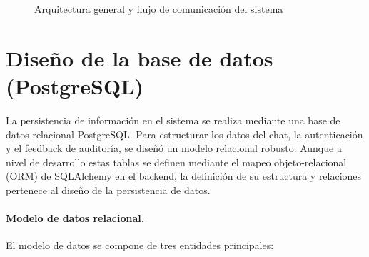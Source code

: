\documentclass[12pt,a4paper,oneside]{report}
\begin{document}
\begin{figure}[H]
    \caption{Arquitectura general y flujo de comunicación del sistema}
    \label{fig:arquitectura_general_tikz}
\end{figure}

\section{Diseño de la base de datos (PostgreSQL)}

La persistencia de información en el sistema se realiza mediante una base de datos relacional PostgreSQL. Para estructurar los datos del chat, la autenticación y el feedback de auditoría, se diseñó un modelo relacional robusto. Aunque a nivel de desarrollo estas tablas se definen mediante el mapeo objeto-relacional (ORM) de SQLAlchemy en el backend, la definición de su estructura y relaciones pertenece al diseño de la persistencia de datos.

\paragraph{Modelo de datos relacional.} El modelo de datos se compone de tres entidades principales:
\end{document}

